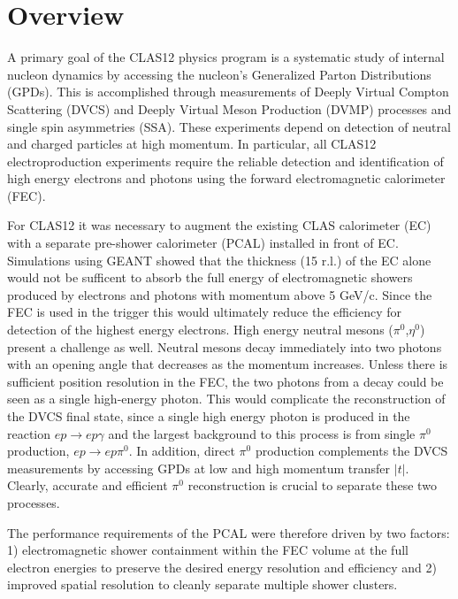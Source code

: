 \section{Overview}

A primary goal of the CLAS12 physics program is a systematic study of internal nucleon dynamics by accessing the nucleon's Generalized Parton Distributions (GPDs). This is accomplished through measurements of Deeply Virtual Compton Scattering (DVCS) and Deeply Virtual Meson Production (DVMP) processes and single spin asymmetries (SSA). 
These experiments depend on detection of neutral and charged particles at high momentum. In particular, all CLAS12 electroproduction experiments require the reliable detection and identification of high energy electrons and photons using the forward electromagnetic calorimeter (FEC).

For CLAS12 it was necessary to augment the existing CLAS calorimeter (EC) \cite{clas6nim} with a separate pre-shower calorimeter (PCAL) installed in front of EC. Simulations using GEANT showed that the thickness (15 r.l.) of the EC alone would not be sufficent to absorb the full energy of electromagnetic showers produced by electrons and photons with momentum above 5 GeV/c. Since the FEC is used in the trigger this would ultimately reduce the efficiency for detection of the highest energy electrons.  High energy neutral mesons ($\pi^{0}$,$\eta^{0}$) present a challenge as well. Neutral mesons decay immediately into two photons with an opening angle that decreases as the momentum increases. Unless there is sufficient position resolution in the FEC, the two photons from a decay could be seen as a single high-energy photon.  This would complicate the reconstruction of the DVCS final state, since a single high energy photon is produced in the reaction $ep \to ep\gamma$ and the largest background to this process is from single $\pi^{0}$ production, $ep \to ep\pi^{0}$.  In addition, direct $\pi^{0}$ production complements the DVCS measurements by accessing GPDs at low and high momentum transfer $|t|$. Clearly, accurate and efficient $\pi^{0}$ reconstruction is crucial to separate these two processes. 

The performance requirements of the PCAL were therefore driven by two factors: 1) electromagnetic shower containment within the FEC volume at the full electron energies to preserve the desired energy resolution and efficiency and 2) improved spatial resolution to cleanly separate multiple shower clusters.  




